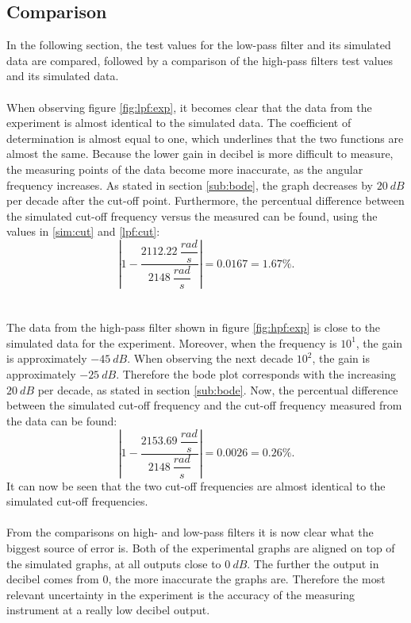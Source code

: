 \subsection{Comparison}
In the following section, the test values for the low-pass filter and its simulated data are compared, followed by a comparison of the high-pass filters test values and its simulated data.
\\ \\
When observing figure \ref{fig:lpf:exp}, it becomes clear that the data from the experiment is almost identical to the simulated data. The coefficient of determination is almost equal to one, which underlines that the two functions are almost the same. Because the lower gain in decibel is more difficult to measure, the measuring points of the data become more inaccurate, as the angular frequency increases. As stated in section \ref{sub:bode}, the graph decreases by $20\ dB$ per decade after the cut-off point. Furthermore, the percentual difference between the simulated cut-off frequency versus the measured can be found, using the values in \eqref{sim:cut} and \eqref{lpf:cut}: $$\left|1-\dfrac{2112.22\ \dfrac{rad}{s}}{2148\ \dfrac{rad}{s}}\right|= 0.0167 = 1.67 \%.$$
\\ \\
The data from the high-pass filter shown in figure \ref{fig:hpf:exp} is close to the simulated data for the experiment. Moreover, when the frequency is $10^{1}$, the gain is approximately $-45\ dB$. When observing the next decade $10^{2}$, the gain is approximately $-25\ dB$. Therefore the bode plot corresponds with the increasing $20\ dB$ per decade, as stated in section \ref{sub:bode}. Now, the percentual difference between the simulated cut-off frequency  and the cut-off frequency measured from the data can be found: 
$$\left|1-\dfrac{2153.69\ \dfrac{rad}{s}}{2148\ \dfrac{rad}{s}}\right|= 0.0026 = 0.26 \%.$$
It can now be seen that the two cut-off frequencies are almost identical to the simulated cut-off frequencies.
\\ \\
From the comparisons on high- and low-pass filters it is now clear what the biggest source of error is. Both of the experimental graphs are aligned on top of the simulated graphs, at all outputs close to $0\ dB$. The further the output in decibel comes from 0, the more inaccurate the graphs are. Therefore the most relevant uncertainty in the experiment is the accuracy of the measuring instrument at a really low decibel output.